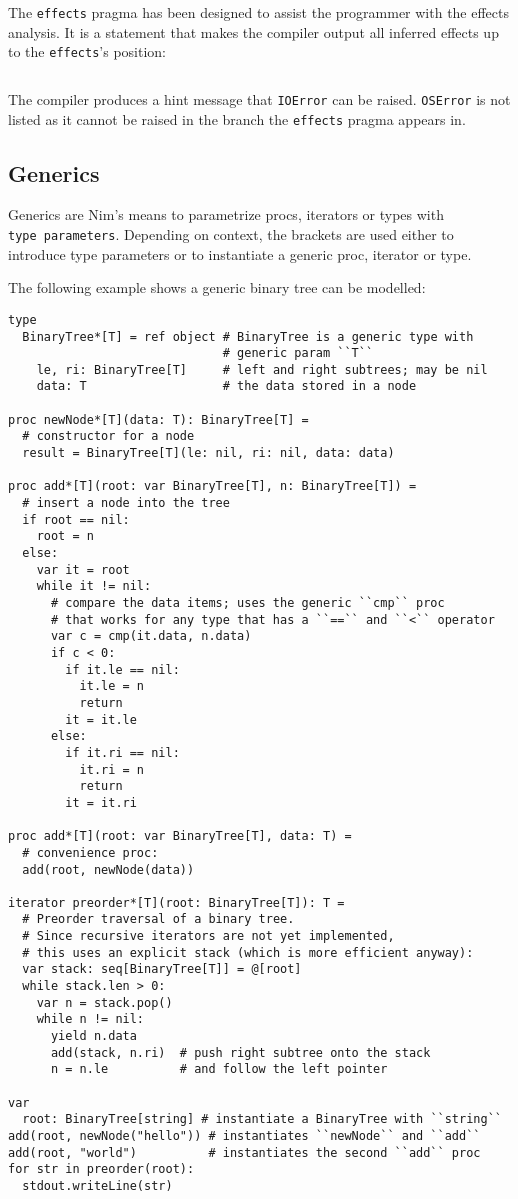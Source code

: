 The \texttt{effects} pragma has been designed to assist the programmer
with the effects analysis. It is a statement that makes the compiler
output all inferred effects up to the \texttt{effects}'s position:

\begin{verbatim}
\end{verbatim}

The compiler produces a hint message that \texttt{IOError} can be
raised. \texttt{OSError} is not listed as it cannot be raised in the
branch the \texttt{effects} pragma appears in.

\hypertarget{generics}{%
\subsection{Generics}\label{generics}}

Generics are Nim's means to parametrize procs, iterators or types with
\texttt{type\ parameters}. Depending on context, the brackets are used
either to introduce type parameters or to instantiate a generic proc,
iterator or type.

The following example shows a generic binary tree can be modelled:

\begin{verbatim}
type
  BinaryTree*[T] = ref object # BinaryTree is a generic type with
                              # generic param ``T``
    le, ri: BinaryTree[T]     # left and right subtrees; may be nil
    data: T                   # the data stored in a node

proc newNode*[T](data: T): BinaryTree[T] =
  # constructor for a node
  result = BinaryTree[T](le: nil, ri: nil, data: data)

proc add*[T](root: var BinaryTree[T], n: BinaryTree[T]) =
  # insert a node into the tree
  if root == nil:
    root = n
  else:
    var it = root
    while it != nil:
      # compare the data items; uses the generic ``cmp`` proc
      # that works for any type that has a ``==`` and ``<`` operator
      var c = cmp(it.data, n.data)
      if c < 0:
        if it.le == nil:
          it.le = n
          return
        it = it.le
      else:
        if it.ri == nil:
          it.ri = n
          return
        it = it.ri

proc add*[T](root: var BinaryTree[T], data: T) =
  # convenience proc:
  add(root, newNode(data))

iterator preorder*[T](root: BinaryTree[T]): T =
  # Preorder traversal of a binary tree.
  # Since recursive iterators are not yet implemented,
  # this uses an explicit stack (which is more efficient anyway):
  var stack: seq[BinaryTree[T]] = @[root]
  while stack.len > 0:
    var n = stack.pop()
    while n != nil:
      yield n.data
      add(stack, n.ri)  # push right subtree onto the stack
      n = n.le          # and follow the left pointer

var
  root: BinaryTree[string] # instantiate a BinaryTree with ``string``
add(root, newNode("hello")) # instantiates ``newNode`` and ``add``
add(root, "world")          # instantiates the second ``add`` proc
for str in preorder(root):
  stdout.writeLine(str)
\end{verbatim}

